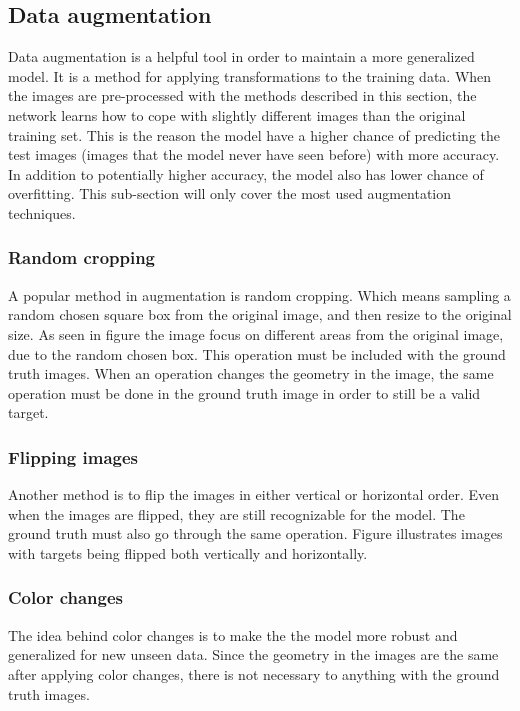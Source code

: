 \documentclass[USenglish]{ifimaster}  %
\begin{document}
\subsection{Data augmentation}
Data augmentation is a helpful tool in order to maintain a more generalized model. It is a method for applying transformations to the training data. When the images are pre-processed with the methods described in this section, the network learns how to cope with slightly different images than the original training set. This is the reason the model have a higher chance of predicting the test images (images that the model never have seen before) with more accuracy. In addition to potentially higher accuracy, the model also has lower chance of overfitting. This sub-section will only cover the most used augmentation techniques.  
\subsubsection{Random cropping}
A popular method in augmentation is random cropping. Which means sampling a random chosen square box from the original image, and then resize to the original size. As seen in figure  the image focus on different areas from the original image, due to the random chosen box. This operation must be included with the ground truth images. When an operation changes the geometry in the image, the same operation must be done in the ground truth image in order to still be a valid target. 
\subsubsection{Flipping images}
Another method is to flip the images in either vertical or horizontal order. Even when the images are flipped, they are still recognizable for the model. The ground truth must also go through the same operation. Figure  illustrates images with targets being flipped both vertically and horizontally.  
\subsubsection{Color changes}
The idea behind color changes is to make the the model more robust and generalized for new unseen data. Since the geometry in the images are the same after applying color changes, there is not necessary to anything with the ground truth images.
\end{document}
